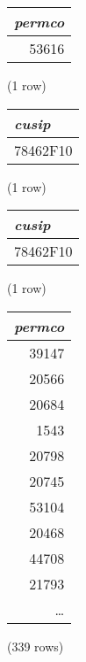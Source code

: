 \begin{center}
\begin{tabular}{r}
\textit{permco} \\
\hline
53616 \\
\end{tabular}

\noindent (1 row) \\
\end{center}

\begin{center}
\begin{tabular}{l}
\textit{cusip} \\
\hline
78462F10 \\
\end{tabular}

\noindent (1 row) \\
\end{center}

\begin{center}
\begin{tabular}{l}
\textit{cusip} \\
\hline
78462F10 \\
\end{tabular}

\noindent (1 row) \\
\end{center}

\begin{center}
\begin{tabular}{r}
\textit{permco} \\
\hline
39147 \\
20566 \\
20684 \\
1543 \\
20798 \\
20745 \\
53104 \\
20468 \\
44708 \\
21793 \\
\ldots \\
\end{tabular}

\noindent (339 rows) \\
\end{center}

